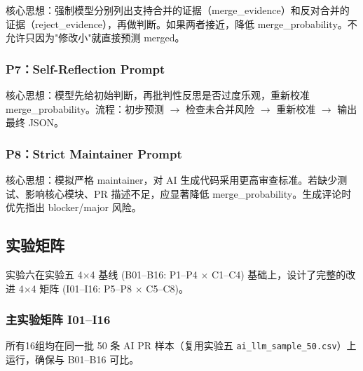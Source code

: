 \documentclass{experimentreport}
\begin{document}
核心思想：强制模型分别列出支持合并的证据（merge\_evidence）和反对合并的证据（reject\_evidence），再做判断。如果两者接近，降低 merge\_probability。不允许只因为"修改小"就直接预测 merged。

\subsubsection{P7：Self-Reflection Prompt}

核心思想：模型先给初始判断，再批判性反思是否过度乐观，重新校准 merge\_probability。流程：初步预测 $\rightarrow$ 检查未合并风险 $\rightarrow$ 重新校准 $\rightarrow$ 输出最终 JSON。

\subsubsection{P8：Strict Maintainer Prompt}

核心思想：模拟严格 maintainer，对 AI 生成代码采用更高审查标准。若缺少测试、影响核心模块、PR 描述不足，应显著降低 merge\_probability。生成评论时优先指出 blocker/major 风险。

\subsection{实验矩阵}

实验六在实验五 4$\times$4 基线 (B01--B16: P1--P4 $\times$ C1--C4) 基础上，设计了完整的改进 4$\times$4 矩阵 (I01--I16: P5--P8 $\times$ C5--C8)。

\subsubsection{主实验矩阵 I01--I16}

所有16组均在同一批 50 条 AI PR 样本（复用实验五 \texttt{ai\_llm\_sample\_50.csv}）上运行，确保与 B01--B16 可比。
\end{document}
